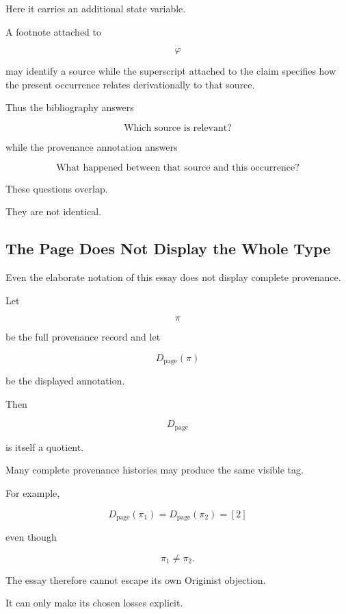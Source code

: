 \documentclass[
  11pt,
  a4paper,
  DIV=12,
  BCOR=0mm,
  parskip=half-
]{scrartcl}
\theoremstyle{definition}
\theoremstyle{plain}
\theoremstyle{remark}
\begin{document}
Here it carries an additional state variable.

A footnote attached to

\[
  \varphi
\]

may identify a source while the superscript attached to the claim specifies
how the present occurrence relates derivationally to that source.

Thus the bibliography answers

\[
  \text{Which source is relevant?}
\]

while the provenance annotation answers

\[
  \text{What happened between that source and this occurrence?}
\]

These questions overlap.

They are not identical.


\subsection{The Page Does Not Display the Whole Type}
\label{app:typography-lossy}

Even the elaborate notation of this essay does not display complete provenance.

Let

\[
  \pi
\]

be the full provenance record and let

\[
  D_{\mathrm{page}}(\pi)
\]

be the displayed annotation.

Then

\[
  D_{\mathrm{page}}
\]

is itself a quotient.

Many complete provenance histories may produce the same visible tag.

For example,

\[
  D_{\mathrm{page}}(\pi_1)
  =
  D_{\mathrm{page}}(\pi_2)
  =
  [2]
\]

even though

\[
  \pi_1\neq\pi_2.
\]

The essay therefore cannot escape its own Originist objection.

It can only make its chosen losses explicit.
\end{document}
